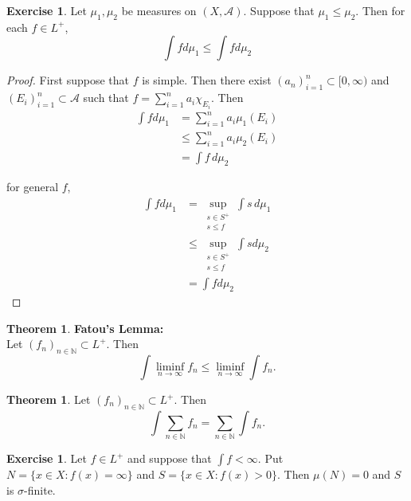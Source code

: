 \documentclass{book}
\theoremstyle{definition}
\newtheorem{thm}[definition]{Theorem}
\newtheorem{ex}[definition]{Exercise}
\newcommand{\sig}{\sigma}
\newcommand{\N}{\mathbb{N}}
\newcommand{\MA}{\mathcal{A}}
\newcommand{\lex}[1]{\label{ex:#1}}
\DeclareMathOperator*{\0}{\mbf{0}}
\DeclareMathOperator*{\1}{\mbf{1}}
\newcommand{\limfn}{\liminf \limits_{n \rightarrow \infty}}
\newcommand{\Rg}{[0,\infty)}
\newcommand{\dmu}{\, d \mu}
\begin{document}
	
	\begin{ex} \lex{00000} 
		Let $\mu_1, \mu_2$ be measures on $(X,\MA)$. Suppose that $\mu_1 \leq \mu_2$. Then for each $f \in L^+$, $$\int f d\mu_1 \leq \int f d\mu_2$$
	\end{ex}
	
	\begin{proof}
		First suppose that $f$ is simple. Then there exist $(a_n)_{i=1}^n \subset \Rg$ and $(E_i)_{i=1}^n \subset \MA$ such that $f = \sum\limits_{i =1}^n a_i \chi_{E_i}$. Then 
		\begin{align*}
			\int f d\mu_1 
			&= \sum\limits_{i =1}^n a_i \mu_1(E_i)\\
			& \leq \sum\limits_{i =1}^n a_i \mu_2(E_i)\\
			&= \int f \dmu_2
		\end{align*} 
		
		for general $f$, 
		\begin{align*}
			\int f d\mu_1 
			&= \sup_{\substack{s \in S^+\\s \leq f}} \int s \dmu_1 \\
			& \leq \sup_{\substack{s \in S^+\\s \leq f}} \int s d\mu_2\\
			&= \int f d\mu_2
		\end{align*}
		
	\end{proof}
	
	\begin{thm} \textbf{Fatou's Lemma:}\\
		Let $(f_n)_{n \in \N} \subset L^+$. Then $$\int \limfn f_n \leq \limfn \int f_n.$$
	\end{thm}
	
	\begin{thm}
		Let $(f_n)_{n \in \N} \subset L^+$. Then $$\int \sum_{n \in \N} f_n= \sum_{n \in \N} \int f_n.$$
	\end{thm}
	
	\begin{ex} \lex{00000} 
		Let $f \in L^+$ and suppose that $\int f < \infty$. Put $N = \{x \in X: f(x) = \infty\}$ and $S = \{x \in X: f(x) > 0\}$. Then $\mu(N) = 0$ and $S$ is $\sig$-finite.
	\end{ex}
	
\end{document}
